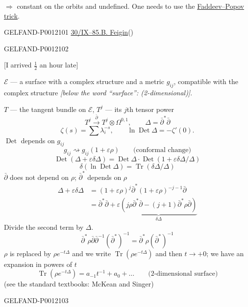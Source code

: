 \(\Rightarrow\) constant on the orbits and undefined. One needs to use the \underline{Faddeev--Popov trick}.


\begin{GelfandAdjacentEvidence}{GELFAND-P001210}{1}
\underline{30/IX--85.}\qquad\underline{B. Feigin}\quad()

\end{GelfandAdjacentEvidence}
\begin{GelfandAdjacentEvidence}{GELFAND-P001210}{2}



[I arrived \(\frac12\) an hour late]


\(\mathcal E\) --- a surface with a complex structure and a metric \(g_{ij}\), compatible with the complex structure
\textit{[below the word “surface”: (2-dimensional)]}.

\(T\) --- the tangent bundle on \(\mathcal E\), \(T^j\) --- its \(j\)th tensor power
\[
T^j\overset{\bar\partial}{\longrightarrow}T^j\otimes\Omega^{0,1},
\qquad \Delta=\bar\partial^*\bar\partial
\]
\[
\zeta(s)=\sum\lambda_i^{-s},\qquad
\ln\operatorname{Det}\Delta=-\zeta'(0).
\]
\(\operatorname{Det}\) depends on \(g_{ij}\)
\[
g_{ij}\rightsquigarrow g_{ij}(1+\varepsilon\rho)
\qquad\text{(conformal change)}
\]
\[
\operatorname{Det}(\Delta+\varepsilon\delta\Delta)
=\operatorname{Det}\Delta\cdot
\operatorname{Det}\left(1+\varepsilon\delta\Delta/\Delta\right)
\]
\[
\delta(\ln\operatorname{Det}\Delta)=\operatorname{Tr}(\delta\Delta/\Delta)
\]
\(\bar\partial\) does not depend on \(\rho\); \(\bar\partial^*\) depends on \(\rho\)
\[
\begin{aligned}
\Delta+\varepsilon\delta\Delta
&=(1+\varepsilon\rho)^j\bar\partial^*(1+\varepsilon\rho)^{-j-1}\bar\partial\\
&=\bar\partial^*\bar\partial+
\varepsilon\underbrace{\left(j\rho\bar\partial^*\bar\partial
-(j+1)\bar\partial^*\rho\bar\partial\right)}_{\delta\Delta}
\end{aligned}
\]
Divide the second term by \(\Delta\).
\[
\bar\partial^*\rho\bar\partial\bar\partial^{-1}(\bar\partial^*)^{-1}
=\bar\partial^*\rho(\bar\partial^*)^{-1}
\]
\(\rho\) is replaced by \(\rho e^{-t\Delta}\) and we write
\(\operatorname{Tr}(\rho e^{-t\Delta})\) and then \(t\to+0\);
we have an expansion in powers of \(t\)
\[
\operatorname{Tr}(\rho e^{-t\Delta})=a_{-1}t^{-1}+a_0+\ldots
\qquad\text{(2-dimensional surface)}
\]
(see the standard textbooks: McKean and Singer)
\end{GelfandAdjacentEvidence}
\begin{GelfandAdjacentEvidence}{GELFAND-P001210}{3}

\end{GelfandAdjacentEvidence}


